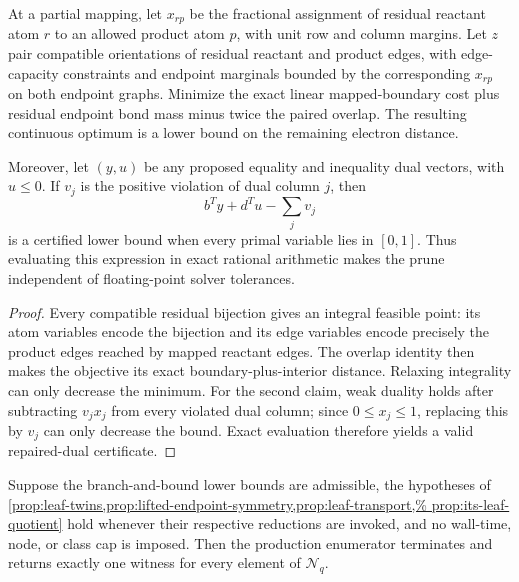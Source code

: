 \begin{proposition}
\label{prop:vertex-edge-lp}
At a partial mapping, let $x_{rp}$ be the fractional assignment of residual
reactant atom $r$ to an allowed product atom $p$, with unit row and column
margins.  Let $z$ pair compatible orientations of residual reactant and
product edges, with edge-capacity constraints and endpoint marginals bounded
by the corresponding $x_{rp}$ on both endpoint graphs.  Minimize the exact
linear mapped-boundary cost plus residual endpoint bond mass minus twice the
paired overlap.  The resulting continuous optimum is a lower bound on the
remaining electron distance.

Moreover, let $(y,u)$ be any proposed equality and inequality dual vectors,
with $u\leq0$.  If $v_j$ is the positive violation of dual column $j$, then
\[
 b^Ty+d^Tu-\sum_jv_j
\]
is a certified lower bound when every primal variable lies in $[0,1]$.
Thus evaluating this expression in exact rational arithmetic makes the prune
independent of floating-point solver tolerances.
\end{proposition}

\begin{proof}
Every compatible residual bijection gives an integral feasible point: its
atom variables encode the bijection and its edge variables encode precisely
the product edges reached by mapped reactant edges.  The overlap identity then
makes the objective its exact boundary-plus-interior distance.  Relaxing
integrality can only decrease the minimum.  For the second claim, weak duality
holds after subtracting $v_jx_j$ from every violated dual column; since
$0\leq x_j\leq1$, replacing this by $v_j$ can only decrease the bound.  Exact
evaluation therefore yields a valid repaired-dual certificate.
\end{proof}

\begin{theorem}
\label{thm:production-exact}
Suppose the branch-and-bound lower bounds are admissible, the hypotheses of
\cref{prop:leaf-twins,prop:lifted-endpoint-symmetry,prop:leaf-transport,%
prop:its-leaf-quotient} hold whenever their respective reductions are invoked,
and no wall-time, node, or class cap is imposed.  Then the production
enumerator terminates and returns exactly one witness for every element of
$\mathcal N_q$.
\end{theorem}


